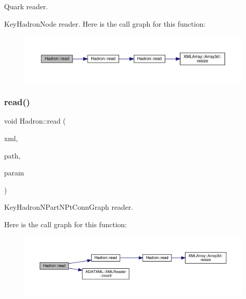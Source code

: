 Quark reader. 

Key\+Hadron\+Node reader. Here is the call graph for this function\+:\nopagebreak
\begin{figure}[H]
\begin{center}
\leavevmode
\includegraphics[width=350pt]{d1/daf/namespaceHadron_a6eef93fdb3fe356c6326b6e8e0757ccb_cgraph}
\end{center}
\end{figure}
\mbox{\label{namespaceHadron_a3250f56af4c72ab50d162f878b999c09}} 
\subsubsection{\texorpdfstring{read()}{read()}\hspace{0.1cm}{\footnotesize\ttfamily [68/94]}}
{\footnotesize\ttfamily void Hadron\+::read (\begin{DoxyParamCaption}\item[{\mbox{\hyperlink{classADATXML_1_1XMLReader}{X\+M\+L\+Reader}} \&}]{xml,  }\item[{const std\+::string \&}]{path,  }\item[{\mbox{\hyperlink{structHadron_1_1KeyHadronNPartNPtConnGraph__t}{Key\+Hadron\+N\+Part\+N\+Pt\+Conn\+Graph\+\_\+t}} \&}]{param }\end{DoxyParamCaption})}



Key\+Hadron\+N\+Part\+N\+Pt\+Conn\+Graph reader. 

Here is the call graph for this function\+:\nopagebreak
\begin{figure}[H]
\begin{center}
\leavevmode
\includegraphics[width=350pt]{d1/daf/namespaceHadron_a3250f56af4c72ab50d162f878b999c09_cgraph}
\end{center}
\end{figure}
\mbox{\label{namespaceHadron_a030f71bff6ae10166b42e24845e0dbf8}} 
